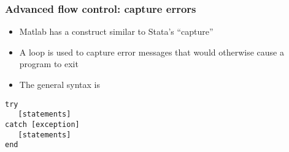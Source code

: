 \documentclass[english,xcolor=dvipsnames]{beamer}
\newcommand{\bi}{\begin{itemize}}
\newcommand{\ei}{\end{itemize}}
\begin{document}
\begin{frame}[fragile]
\frametitle{Advanced flow control: capture errors}
   \bi
	 \item Matlab has a construct similar to Stata's ``capture''
	 \item A  loop is used to capture error messages that would otherwise cause a program to exit
	 \item The general syntax is
   \ei
\begin{lstlisting}
try
   [statements]
catch [exception]
   [statements]
end
\end{lstlisting}
\end{frame}
\end{document}

